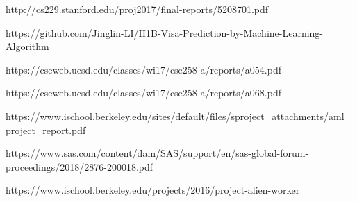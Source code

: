 \documentclass[conference]{IEEEtran}
\begin{document}
\begin{thebibliography}{00}
\item {http://cs229.stanford.edu/proj2017/final-reports/5208701.pdf}
\item {https://github.com/Jinglin-LI/H1B-Visa-Prediction-by-Machine-Learning-Algorithm}
\item {https://cseweb.ucsd.edu/classes/wi17/cse258-a/reports/a054.pdf}
\item {https://cseweb.ucsd.edu/classes/wi17/cse258-a/reports/a068.pdf}
\item {https://www.ischool.berkeley.edu/sites/default/files/sproject\_attachments/aml\_project\_report.pdf}
\item {https://www.sas.com/content/dam/SAS/support/en/sas-global-forum-proceedings/2018/2876-200018.pdf}
\item {https://www.ischool.berkeley.edu/projects/2016/project-alien-worker}
\end{thebibliography}
\vspace{12pt}
\end{document}
